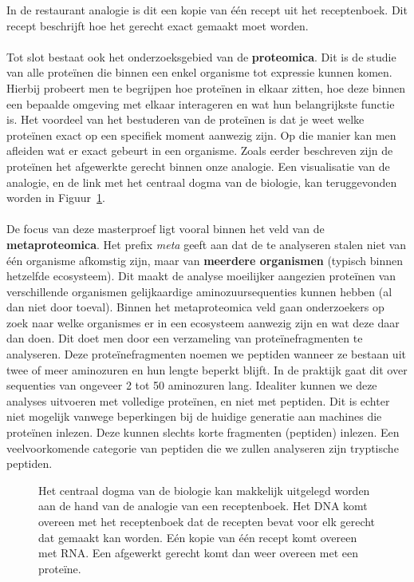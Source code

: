 In de restaurant analogie is dit een kopie van één recept uit het receptenboek.
Dit recept beschrijft hoe het gerecht exact gemaakt moet worden.
\\ \\
Tot slot bestaat ook het onderzoeksgebied van de \textbf{proteomica}.
Dit is de studie van alle proteïnen die binnen een enkel organisme tot expressie kunnen komen.
Hierbij probeert men te begrijpen hoe proteïnen in elkaar zitten, hoe deze binnen een bepaalde omgeving met elkaar interageren en wat hun belangrijkste functie is.
Het voordeel van het bestuderen van de proteïnen is dat je weet welke proteïnen exact op een specifiek moment aanwezig zijn.
Op die manier kan men afleiden wat er exact gebeurt in een organisme.
Zoals eerder beschreven zijn de proteïnen het afgewerkte gerecht binnen onze analogie.
Een visualisatie van de analogie, en de link met het centraal dogma van de biologie, kan teruggevonden worden in Figuur~\ref{fig:recipe}.
\\ \\
De focus van deze masterproef ligt vooral binnen het veld van de \textbf{metaproteomica}.
Het prefix \textit{meta} geeft aan dat de te analyseren stalen niet van één organisme afkomstig zijn, maar van \textbf{meerdere organismen} (typisch binnen hetzelfde ecosysteem).
Dit maakt de analyse moeilijker aangezien proteïnen van verschillende organismen gelijkaardige aminozuursequenties kunnen hebben (al dan niet door toeval).
Binnen het metaproteomica veld gaan onderzoekers op zoek naar welke organismes er in een ecosysteem aanwezig zijn en wat deze daar dan doen.
Dit doet men door een verzameling van proteïnefragmenten te analyseren.
Deze proteïnefragmenten noemen we peptiden wanneer ze bestaan uit twee of meer aminozuren en hun lengte beperkt blijft.
In de praktijk gaat dit over sequenties van ongeveer 2 tot 50 aminozuren lang.
Idealiter kunnen we deze analyses uitvoeren met volledige proteïnen, en niet met peptiden.
Dit is echter niet mogelijk vanwege beperkingen bij de huidige generatie aan machines die proteïnen inlezen.
Deze kunnen slechts korte fragmenten (peptiden) inlezen.
Een veelvoorkomende categorie van peptiden die we zullen analyseren zijn tryptische peptiden.

\begin{figure}[H]
    \centering
    
    \caption{Het centraal dogma van de biologie kan makkelijk uitgelegd worden aan de hand van de analogie van een receptenboek. Het DNA komt overeen met het receptenboek dat de recepten bevat voor elk gerecht dat gemaakt kan worden. Eén kopie van één recept komt overeen met RNA. Een afgewerkt gerecht komt dan weer overeen met een proteïne.}
    \label{fig:recipe}
\end{figure}


